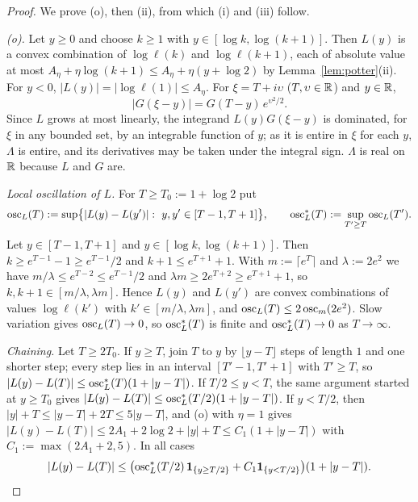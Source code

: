 \begin{proof}
We prove (o), then (ii), from which (i) and (iii) follow.

\emph{(o).} Let $y\ge0$ and choose $k\ge1$ with $y\in[\log k,\log(k+1)]$. Then $L(y)$ is a convex combination of
$\log\ell(k)$ and $\log\ell(k+1)$, each of absolute value at most $A_\eta+\eta\log(k+1)\le A_\eta+\eta(y+\log2)$ by
Lemma~\ref{lem:potter}(ii). For $y<0$, $|L(y)|=|\log\ell(1)|\le A_\eta$. For $\xi=T+i\upsilon$ ($T,\upsilon\in\mathbb{R}$) and $y\in\mathbb{R}$,
\begin{equation}\label{eq:gauss-abs}
  |G(\xi-y)|=G(T-y)\,e^{\upsilon^2/2}.
\end{equation}
Since $L$ grows at most linearly, the integrand $L(y)G(\xi-y)$ is dominated, for $\xi$ in any bounded set, by an
integrable function of $y$; as it is entire in $\xi$ for each $y$, $\Lambda$ is entire, and its derivatives may be
taken under the integral sign. $\Lambda$ is real on $\mathbb{R}$ because $L$ and $G$ are.

\emph{Local oscillation of $L$.} For $T\ge T_0:=1+\log2$ put
\[
  \osc_L(T):=\sup\bigl\{|L(y)-L(y')|:\ y,y'\in[T-1,T+1]\bigr\},\qquad \osc_L^*(T):=\sup_{T'\ge T}\osc_L(T').
\]
Let $y\in[T-1,T+1]$ and $y\in[\log k,\log(k+1)]$. Then $k\ge e^{T-1}-1\ge e^{T-1}/2$ and $k+1\le e^{T+1}+1$. With
$m:=\lceil e^T\rceil$ and $\lambda:=2e^2$ we have $m/\lambda\le e^{T-2}\le e^{T-1}/2$ and $\lambda m\ge2e^{T+2}\ge
e^{T+1}+1$, so $k,k+1\in[m/\lambda,\lambda m]$. Hence $L(y)$ and $L(y')$ are convex combinations of values $\log\ell(k')$
with $k'\in[m/\lambda,\lambda m]$, and $\operatorname{osc}_L(T)\le2\operatorname{osc}_m(2e^2)$. Slow variation gives $\operatorname{osc}_L(T)\to0$, so
$\operatorname{osc}_L^*(T)$ is finite and $\operatorname{osc}_L^*(T)\to0$ as $T\to\infty$.

\emph{Chaining.} Let $T\ge2T_0$. If $y\ge T$, join $T$ to $y$ by $\lfloor y-T\rfloor$ steps of length $1$ and one shorter
step; every step lies in an interval $[T'-1,T'+1]$ with $T'\ge T$, so $|L(y)-L(T)|\le\operatorname{osc}_L^*(T)(1+|y-T|)$. If
$T/2\le y<T$, the same argument started at $y\ge T_0$ gives $|L(y)-L(T)|\le\operatorname{osc}_L^*(T/2)(1+|y-T|)$. If $y<T/2$, then
$|y|+T\le|y-T|+2T\le5|y-T|$, and (o) with $\eta=1$ gives $|L(y)-L(T)|\le2A_1+2\log2+|y|+T\le C_1(1+|y-T|)$ with
$C_1:=\max(2A_1+2,5)$. In all cases
\begin{equation}\label{eq:chaining}
  |L(y)-L(T)|\le\bigl(\operatorname{osc}_L^*(T/2)\,\mathbf 1_{\{y\ge T/2\}}+C_1\mathbf 1_{\{y<T/2\}}\bigr)(1+|y-T|).
\end{equation}


\end{proof}
